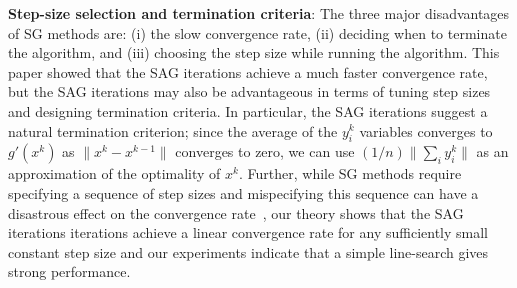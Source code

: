 \documentclass{article}
\def\norm#1{\|#1\|}
\begin{document}

 \textbf{Step-size selection and termination criteria}: The three major disadvantages of SG methods are: (i) the slow convergence rate, (ii) deciding when to terminate the algorithm, and (iii) choosing the step size while running the algorithm.  This paper showed that the SAG iterations achieve a much faster convergence rate, but the SAG iterations may also be advantageous in terms of tuning step sizes and designing termination criteria.  In particular, the SAG iterations suggest a natural termination criterion; 
 since the average of the $y_i^k$ variables converges to $g'(x^k)$ as $\norm{x^k-x^{k-1}}$ converges to zero, we can use $(1/n)\norm{\sum_iy_i^k}$ as an approximation of the optimality of $x^k$. Further, while SG methods require specifying a sequence of step sizes and mispecifying this sequence can have a disastrous effect on the convergence rate~\cite[\S2.1]{nemirovski2009robust}, our theory shows that the SAG iterations iterations achieve a linear convergence rate for any sufficiently small constant step size and our experiments indicate that a simple line-search gives strong performance.
\end{document}
